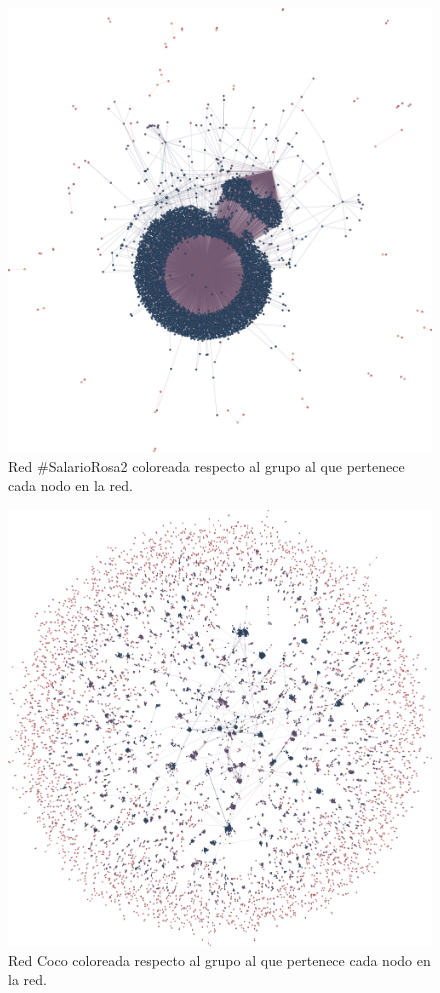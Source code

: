 \begin{figure}
    \centering
    \includegraphics[width=.75\textwidth]{images/SalarioRosa.png}
    \caption{Red \#SalarioRosa2 coloreada respecto al grupo al que pertenece cada nodo en la red.}
    \label{fig:net-salario}
\end{figure}

\begin{figure}
    \centering
    \includegraphics[width=.75\textwidth]{images/Coco.png}
    \caption{Red Coco coloreada respecto al grupo al que pertenece cada nodo en la red.}
    \label{fig:net-coco}
\end{figure}


